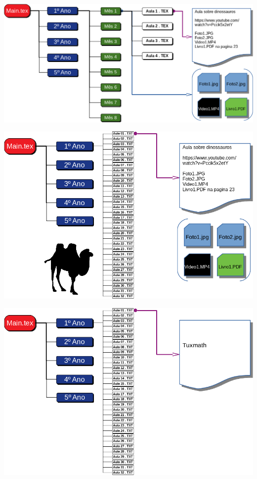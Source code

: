 		\begin{center}
			\includegraphics[width=\linewidth]{./IMG-GIT/SVG/DIAGRAMAS6.png}
		\end{center}
		\pagebreak
		
		\begin{center}
			\includegraphics[height=\textheight]{./IMG-GIT/SVG/DIAGRAMAS7.png}
		\end{center}
		\pagebreak
		
		\begin{center}
			\includegraphics[height=\textheight]{./IMG-GIT/SVG/DIAGRAMAS8.png}
		\end{center}
		\pagebreak
		
